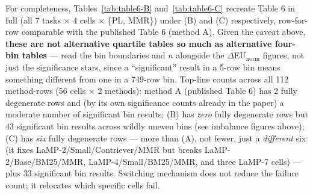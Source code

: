 \documentclass[10pt]{article}
\begin{document}
For completeness, Tables~\ref{tab:table6-B} and~\ref{tab:table6-C} recreate Table 6
in full (all 7 tasks $\times$ 4 cells $\times$ \{PL, MMR\}) under (B) and (C)
respectively, row-for-row comparable with the published Table 6 (method A). Given
the caveat above, \textbf{these are not alternative quartile tables so much as
alternative four-bin tables} --- read the bin boundaries and $n$ alongside the
$\Delta$EU$_{\text{norm}}$ figures, not just the significance stars, since a
``significant'' result in a 5-row bin means something different from one in a
749-row bin. Top-line counts across all 112 method-rows (56 cells $\times$ 2
methods): method A (published Table 6) has 2 fully degenerate rows and (by its own
significance counts already in the paper) a moderate number of significant bin
results; (B) has \emph{zero} fully degenerate rows but 43 significant bin results
across wildly uneven bins (see imbalance figures above); (C) has \emph{six} fully
degenerate rows --- more than (A), not fewer, just a \emph{different} six (it fixes
LaMP-2/Small/Contriever/MMR but breaks LaMP-2/Base/BM25/MMR, LaMP-4/Small/BM25/MMR,
and three LaMP-7 cells) --- plus 33 significant bin results. Switching mechanism
does not reduce the failure count; it relocates which specific cells fail.
\end{document}
